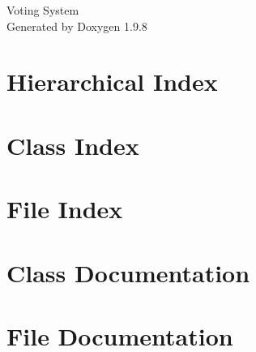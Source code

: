 \documentclass[twoside]{book}
\newcommand{\+}{\discretionary{\mbox{\scriptsize$\hookleftarrow$}}{}{}}
\newcommand{\clearemptydoublepage}{%
    \newpage{\pagestyle{empty}\cleardoublepage}%
  }
\begin{document}
  \raggedbottom
    \hypersetup{pageanchor=false,
                bookmarksnumbered=true,
                pdfencoding=unicode
               }
  \begin{titlepage}
  \vspace*{7cm}
  \begin{center}%
  {\Large Voting System}\\
  \vspace*{1cm}
  {\large Generated by Doxygen 1.9.8}\\
  \end{center}
  \end{titlepage}
  \clearemptydoublepage
  \tableofcontents
  \clearemptydoublepage
  \hypersetup{pageanchor=true}
\chapter{Hierarchical Index}

\chapter{Class Index}

\chapter{File Index}

\chapter{Class Documentation}





\chapter{File Documentation}






  \backmatter
  \newpage
  \clearemptydoublepage
  \printindex
\end{document}
